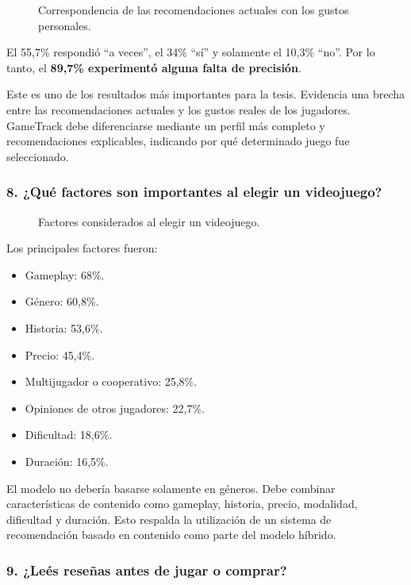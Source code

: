 \begin{figure}[H]
	\centering
	\caption{Correspondencia de las recomendaciones actuales con los gustos personales.}
	\label{fig:enc-p07}
\end{figure}

El 55,7\% respondió \enquote{a veces}, el 34\% \enquote{sí} y solamente el 10,3\% \enquote{no}. Por lo tanto, el \textbf{89,7\% experimentó alguna falta de precisión}.

Este es uno de los resultados más importantes para la tesis. Evidencia una brecha entre las recomendaciones actuales y los gustos reales de los jugadores. GameTrack debe diferenciarse mediante un perfil más completo y recomendaciones explicables, indicando por qué determinado juego fue seleccionado.

\subsubsection*{8. ¿Qué factores son importantes al elegir un videojuego?}

\begin{figure}[H]
	\centering
	\caption{Factores considerados al elegir un videojuego.}
	\label{fig:enc-p08}
\end{figure}

Los principales factores fueron:

\begin{itemize}
	\item Gameplay: 68\%.
	\item Género: 60,8\%.
	\item Historia: 53,6\%.
	\item Precio: 45,4\%.
	\item Multijugador o cooperativo: 25,8\%.
	\item Opiniones de otros jugadores: 22,7\%.
	\item Dificultad: 18,6\%.
	\item Duración: 16,5\%.
\end{itemize}

El modelo no debería basarse solamente en géneros. Debe combinar características de contenido como gameplay, historia, precio, modalidad, dificultad y duración. Esto respalda la utilización de un sistema de recomendación basado en contenido como parte del modelo híbrido.

\subsubsection*{9. ¿Leés reseñas antes de jugar o comprar?}

